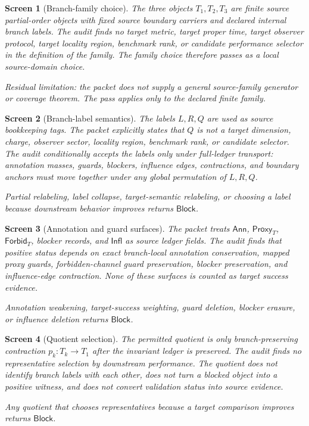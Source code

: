 \documentclass[11pt]{article}
\newcommand{\Ann}{\mathsf{Ann}}
\newcommand{\Proxy}{\mathsf{Proxy}_{T}}
\newcommand{\Forbid}{\mathsf{Forbid}_{T}}
\newcommand{\Infl}{\mathsf{Infl}}
\newcommand{\Block}{\mathsf{Block}}
\newtheorem{screen}{Screen}
\begin{document}
\begin{screen}[Branch-family choice]
The three objects \(T_{1},T_{2},T_{3}\) are finite source partial-order
objects with fixed source boundary carriers and declared internal branch
labels. The audit finds no target metric, target proper time, target
observer protocol, target locality region, benchmark rank, or candidate
performance selector in the definition of the family. The family choice
therefore passes as a local source-domain choice.

Residual limitation: the packet does not supply a general source-family
generator or coverage theorem. The pass applies only to the declared
finite family.
\end{screen}

\begin{screen}[Branch-label semantics]
The labels \(L,R,Q\) are used as source bookkeeping tags. The packet
explicitly states that \(Q\) is not a target dimension, charge, observer
sector, locality region, benchmark rank, or candidate selector. The
audit conditionally accepts the labels only under full-ledger transport:
annotation masses, guards, blockers, influence edges, contractions, and
boundary anchors must move together under any global permutation of
\(L,R,Q\).

Partial relabeling, label collapse, target-semantic relabeling, or
choosing a label because downstream behavior improves returns
\(\Block\).
\end{screen}

\begin{screen}[Annotation and guard surfaces]
The packet treats \(\Ann\), \(\Proxy\), \(\Forbid\), blocker records,
and \(\Infl\) as source ledger fields. The audit finds that positive
status depends on exact branch-local annotation conservation, mapped
proxy guards, forbidden-channel guard preservation, blocker preservation,
and influence-edge contraction. None of these surfaces is counted as
target success evidence.

Annotation weakening, target-success weighting, guard deletion, blocker
erasure, or influence deletion returns \(\Block\).
\end{screen}

\begin{screen}[Quotient selection]
The permitted quotient is only branch-preserving contraction
\(p_{k}:T_{k}\to T_{1}\) after the invariant ledger is preserved. The
audit finds no representative selection by downstream performance. The
quotient does not identify branch labels with each other, does not turn
a blocked object into a positive witness, and does not convert validation
status into source evidence.

Any quotient that chooses representatives because a target comparison
improves returns \(\Block\).
\end{screen}
\end{document}
